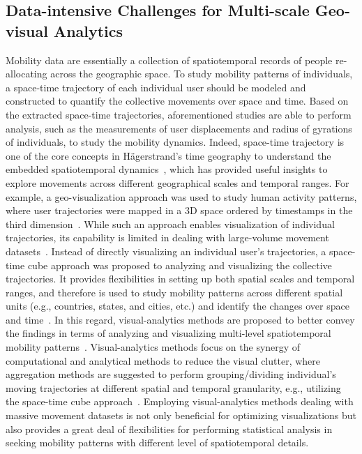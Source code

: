 \documentclass[ijgi,article,accept,moreauthors,pdftex,10pt,a4paper]{mdpi}
\theoremstyle{mdpi}
\newcounter{ex}
\newcounter{re}
\theoremstyle{mdpidefinition}
\begin{document}
\subsection{Data-intensive Challenges for Multi-scale Geo-visual Analytics}
Mobility data are essentially a collection of spatiotemporal records of people re-allocating across the geographic space.
To study mobility patterns of individuals, a space-time trajectory of each individual user should be modeled and constructed to quantify the collective movements over space and time.
Based on the extracted space-time trajectories, aforementioned studies are able to perform analysis, such as the measurements of user displacements and radius of gyrations of individuals, to study the mobility dynamics.
Indeed, space-time trajectory is one of the core concepts in H{\"a}gerstrand's time geography to understand the embedded spatiotemporal dynamics~\cite{hagerstrand1985time}, which has provided useful insights to explore movements across different geographical scales and temporal ranges.
For example, a geo-visualization approach was used to study human activity patterns, where user trajectories were mapped in a 3D space ordered by timestamps in the third dimension~\cite{kwan2004geovisualization}.
While such an approach enables visualization of individual trajectories, its capability is limited in dealing with large-volume movement datasets~\cite{andrienko2007designing}.
Instead of directly visualizing an individual user's trajectories, a space-time cube approach was proposed to analyzing and visualizing the collective trajectories.
It provides flexibilities in setting up both spatial scales and temporal ranges, and therefore is used to study mobility patterns across different spatial units (e.g., countries, states, and cities, etc.) and identify the changes over space and time~\cite{maceachren2001research, maceachren2004maps}.
In this regard, visual-analytics methods are proposed to better convey the findings in terms of analyzing and visualizing multi-level spatiotemporal mobility patterns~\cite{andrienko2007designing,andrienko2007visual}.
Visual-analytics methods focus on the synergy of computational and analytical methods to reduce the visual clutter, where aggregation methods are suggested to perform grouping/dividing individual's moving trajectories at different spatial and temporal granularity, e.g., utilizing the space-time cube approach~\cite{andrienko2007designing}.
Employing visual-analytics methods dealing with massive movement datasets is not only beneficial for optimizing visualizations but also provides a great deal of flexibilities for performing statistical analysis in seeking mobility patterns with different level of spatiotemporal details. 
\end{document}
